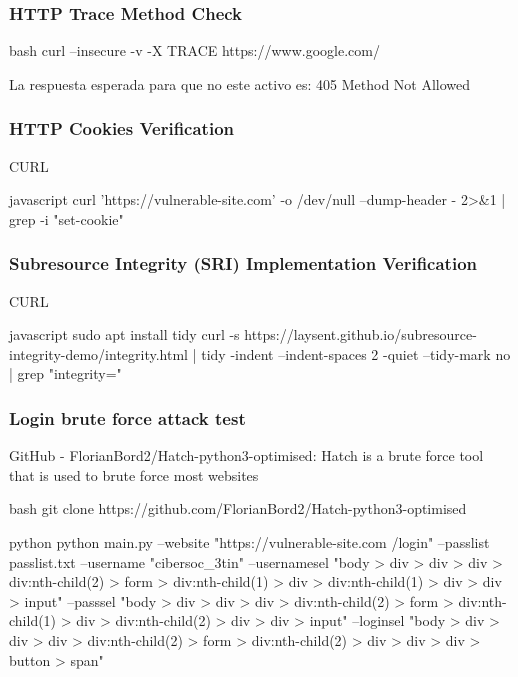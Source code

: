 \documentclass[letterpaper,12pt]{extarticle}
\begin{document}
\subsubsection{HTTP Trace Method Check}

\begin{sourcecode}{bash}
curl --insecure -v -X TRACE https://www.google.com/
\end{sourcecode}

La respuesta esperada para que no este activo es: 405 Method Not Allowed

\subsubsection{HTTP Cookies Verification}

CURL
\begin{sourcecode}{javascript}
curl 'https://vulnerable-site.com' -o /dev/null --dump-header - 2>&1 | grep -i "set-cookie"
\end{sourcecode}

\subsubsection{Subresource Integrity (SRI)  Implementation Verification}

CURL
\begin{sourcecode}{javascript}
sudo apt install tidy
curl -s https://laysent.github.io/subresource-integrity-demo/integrity.html | tidy  -indent --indent-spaces 2 -quiet --tidy-mark no | grep "integrity="
\end{sourcecode}


\subsubsection{Login brute force attack test}

GitHub - FlorianBord2/Hatch-python3-optimised: Hatch is a brute force tool that is used to brute force most websites


\begin{sourcecode}{bash}
	git clone https://github.com/FlorianBord2/Hatch-python3-optimised
\end{sourcecode}


\begin{sourcecode}{python}
	python main.py --website "https://vulnerable-site.com /login" --passlist  passlist.txt  --username "cibersoc_3tin"  --usernamesel "body > div > div > div > div:nth-child(2) > form > div:nth-child(1) > div > div:nth-child(1) > div > div > input" --passsel "body > div > div > div > div:nth-child(2) > form > div:nth-child(1) > div > div:nth-child(2) > div > div > input" --loginsel "body > div > div > div > div:nth-child(2) > form > div:nth-child(2) > div > div > div > button > span"
\end{sourcecode}
\end{document}

